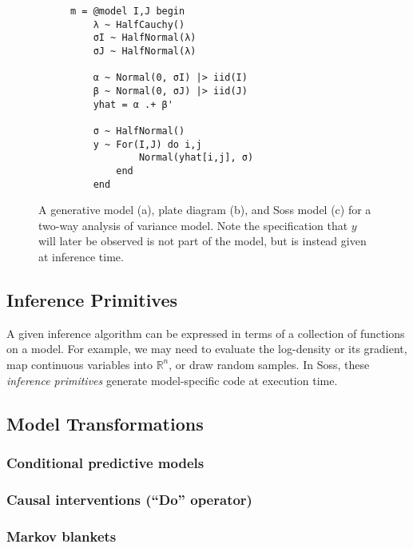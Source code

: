 \documentclass[anonymous=false, %
               format=acmsmall, %
               review=true, %
               screen=true, %
               nonacm=true]{acmart}
\begin{document}
\begin{figure}[t]
\begin{subfigure}[b]{0.3\textwidth}
    \begin{verbatim}
m = @model I,J begin
    λ ~ HalfCauchy()
    σI ~ HalfNormal(λ)
    σJ ~ HalfNormal(λ)
    
    α ~ Normal(0, σI) |> iid(I)
    β ~ Normal(0, σJ) |> iid(J)
    yhat = α .+ β'

    σ ~ HalfNormal()
    y ~ For(I,J) do i,j 
            Normal(yhat[i,j], σ)
        end
    end
    \end{verbatim} 
    \caption{}
    \end{subfigure}

    \caption{A generative model (a), plate diagram (b), and Soss model (c) for a two-way analysis of variance model. Note the specification that $y$ will later be observed is not part of the model, but is instead given at inference time.}
    \label{fig:model}
\end{figure}



\subsection{Inference Primitives}

A given inference algorithm can be expressed in terms of a collection of functions on a model. For example, we may need to evaluate the log-density or its gradient, map continuous variables into $\mathbb{R}^n$, or draw random samples. In Soss, these \emph{inference primitives} generate model-specific code at execution time.


\subsection{Model Transformations}


\subsubsection*{Conditional predictive models}




\subsubsection*{Causal interventions (``Do'' operator)}

\subsubsection*{Markov blankets}
\end{document}

